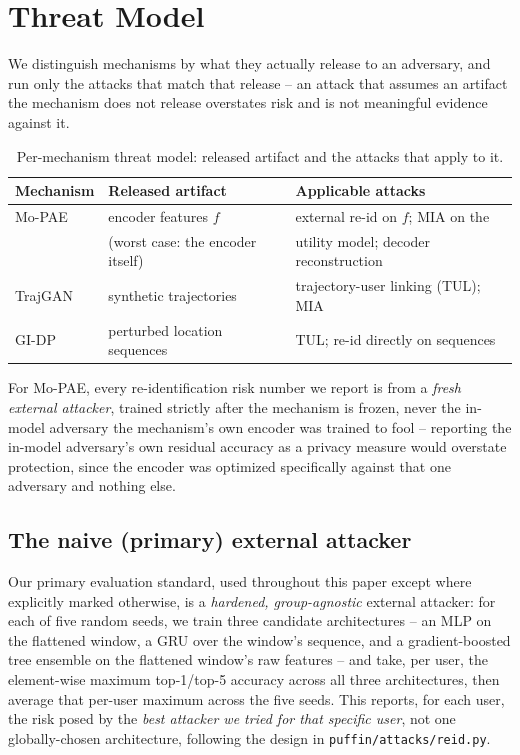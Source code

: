 \section{Threat Model}
\label{sec:threat-model}


We distinguish mechanisms by what they actually release to an
adversary, and run only the attacks that match that release -- an
attack that assumes an artifact the mechanism does not release
overstates risk and is not meaningful evidence against it.

\begin{table}[h]
\centering
\caption{Per-mechanism threat model: released artifact and the attacks
that apply to it.}
\label{tab:threat-model}
\small
\begin{tabular}{@{}lll@{}}
\toprule
Mechanism & Released artifact & Applicable attacks \\
\midrule
Mo-PAE & encoder features $f$ & external re-id on $f$; MIA on the \\
       & (worst case: the encoder itself) & utility model; decoder reconstruction \\
TrajGAN & synthetic trajectories & trajectory-user linking (TUL); MIA \\
GI-DP & perturbed location sequences & TUL; re-id directly on sequences \\
\bottomrule
\end{tabular}
\end{table}

For Mo-PAE, every re-identification risk number we report is from a
\emph{fresh external attacker}, trained strictly after the mechanism
is frozen, never the in-model adversary the mechanism's own encoder was
trained to fool -- reporting the in-model adversary's own residual
accuracy as a privacy measure would overstate protection, since the
encoder was optimized specifically against that one adversary and
nothing else.

\subsection{The naive (primary) external attacker}
\label{sec:threat-model-naive}

Our primary evaluation standard, used throughout this paper except
where explicitly marked otherwise, is a \emph{hardened, group-agnostic}
external attacker: for each of five random seeds, we train three
candidate architectures -- an MLP on the flattened window, a GRU over
the window's sequence, and a gradient-boosted tree ensemble on the
flattened window's raw features -- and take, per user, the
element-wise maximum top-1/top-5 accuracy across all three
architectures, then average that per-user maximum across the five
seeds. This reports, for each user, the risk posed by the \emph{best
attacker we tried for that specific user}, not one globally-chosen
architecture, following the design in \texttt{puffin/attacks/reid.py}.

